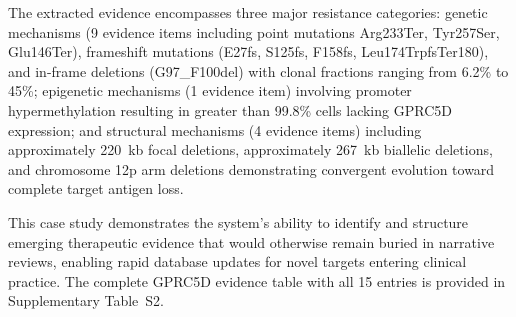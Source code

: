 The extracted evidence encompasses three major resistance categories: genetic mechanisms (9 evidence items including point mutations Arg233Ter, Tyr257Ser, Glu146Ter), frameshift mutations (E27fs, S125fs, F158fs, Leu174TrpfsTer180), and in-frame deletions (G97\_F100del) with clonal fractions ranging from 6.2\% to 45\%; epigenetic mechanisms (1 evidence item) involving promoter hypermethylation resulting in greater than 99.8\% cells lacking GPRC5D expression; and structural mechanisms (4 evidence items) including approximately 220~kb focal deletions, approximately 267~kb biallelic deletions, and chromosome 12p arm deletions demonstrating convergent evolution toward complete target antigen loss.

This case study demonstrates the system's ability to identify and structure emerging therapeutic evidence that would otherwise remain buried in narrative reviews, enabling rapid database updates for novel targets entering clinical practice. The complete GPRC5D evidence table with all 15 entries is provided in Supplementary Table~S2.

%
%
%
%
%
%
%

%
%
%
%

